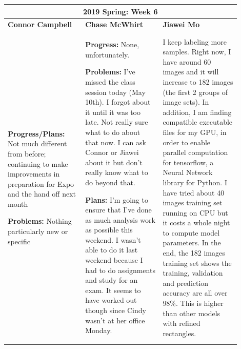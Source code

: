 \documentclass[10pt,journal,compsoc, draftclsnofoot,onecolumn]{IEEEtran}
\begin{document}
\begin{center}
\begin{tabular}{|p{0.3\linewidth}|p{0.3\linewidth}|p{0.3\linewidth}|}
\hline
\multicolumn{3}{|c|}{\textbf{2019 Spring: Week 6}} \\
\hline
\textbf{Connor Campbell} & \textbf{Chase McWhirt} & \textbf{Jiawei Mo} \\ [0.5ex]
\hline\hline

\textbf{Progress/Plans:} Not much different from before; continuing to make improvements in preparation for Expo and the hand off next month

\textbf{Problems:} Nothing particularly new or specific
&
\textbf{Progress:} None, unfortunately.

\textbf{Problems:} I've missed the class session today (May 10th).
I forgot about it until it was too late.
Not really sure what to do about that now.
I can ask Connor or Jiawei about it but don't really know what to do beyond that.

\textbf{Plans:} I'm going to ensure that I've done as much analysis work as possible this weekend.
I wasn't able to do it last weekend because I had to do assignments and study for an exam.
It seems to have worked out though since Cindy wasn't at her office Monday.
&
I keep labeling more samples. Right now, I have around 60 images and it will increase to 182 images (the first 2 groups of image sets). In addition, I am finding compatible executable files for my GPU, in order to enable parallel computation for tensorflow, a Neural Network library for Python. I have tried about 40 images training set running on CPU but it costs a whole night to compute model parameters. In the end, the 182 images training set shows the training, validation and prediction accuracy are all over 98\%. This is higher than other models with refined rectangles.
\\ \hline
\end{tabular}
\end{center}

\newpage
\end{document}
